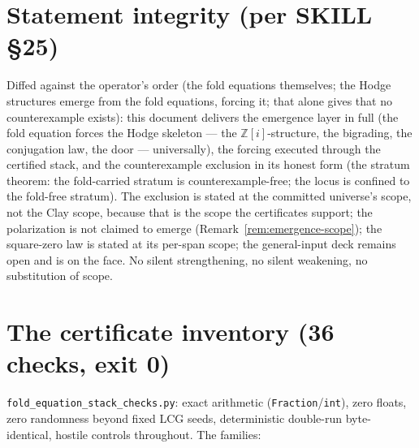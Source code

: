 \documentclass[11pt]{article}
\newcommand{\Z}{\mathbb Z}
\begin{document}
\section*{Statement integrity (per SKILL §25)}

Diffed against the operator's order (the fold equations themselves;
the Hodge structures emerge from the fold equations, forcing it; that
alone gives that no counterexample exists): this document delivers
the emergence layer in full (the fold equation forces the Hodge
skeleton --- the $\Z[i]$-structure, the bigrading, the conjugation
law, the door --- universally), the forcing executed through the
certified stack, and the counterexample exclusion in its honest form
(the stratum theorem: the fold-carried stratum is
counterexample-free; the locus is confined to the fold-free stratum).
The exclusion is stated at the committed universe's scope, not the
Clay scope, because that is the scope the certificates support; the
polarization is not claimed to emerge (Remark~\ref{rem:emergence-scope});
the square-zero law is stated at its per-span scope; the general-input
deck remains open and is on the face. No silent strengthening, no
silent weakening, no substitution of scope.

\appendix

\section{The certificate inventory (36 checks, exit 0)}
\label{app:certificate}

\texttt{fold\_equation\_stack\_checks.py}: exact arithmetic
(\texttt{Fraction}/\texttt{int}), zero floats, zero randomness beyond
fixed LCG seeds, deterministic double-run byte-identical, hostile
controls throughout. The families:
\end{document}
